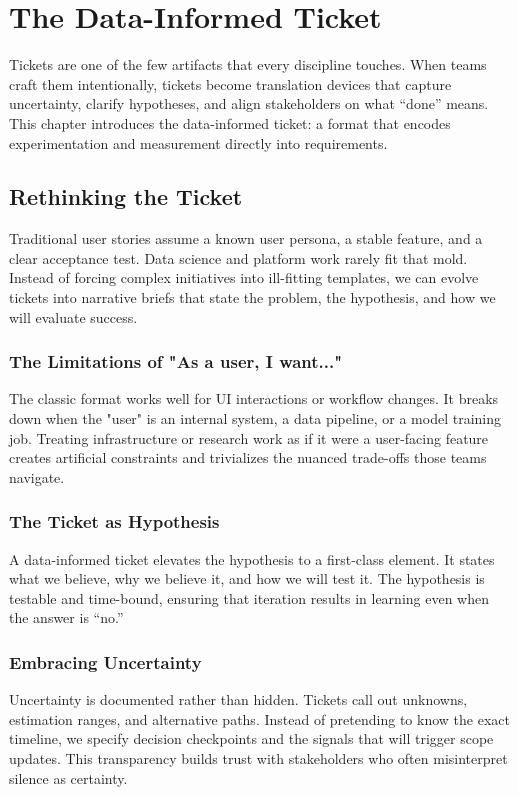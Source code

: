 \chapter{The Data-Informed Ticket}
\label{ch:data-informed-tickets}

Tickets are one of the few artifacts that every discipline touches. When teams craft them intentionally, tickets become translation devices that capture uncertainty, clarify hypotheses, and align stakeholders on what ``done'' means. This chapter introduces the data-informed ticket: a format that encodes experimentation and measurement directly into requirements.

\section{Rethinking the Ticket}
\label{sec:rethinking-ticket}

Traditional user stories assume a known user persona, a stable feature, and a clear acceptance test. Data science and platform work rarely fit that mold. Instead of forcing complex initiatives into ill-fitting templates, we can evolve tickets into narrative briefs that state the problem, the hypothesis, and how we will evaluate success.

\subsection{The Limitations of "As a user, I want..."}
The classic format works well for UI interactions or workflow changes. It breaks down when the "user" is an internal system, a data pipeline, or a model training job. Treating infrastructure or research work as if it were a user-facing feature creates artificial constraints and trivializes the nuanced trade-offs those teams navigate.

\subsection{The Ticket as Hypothesis}
A data-informed ticket elevates the hypothesis to a first-class element. It states what we believe, why we believe it, and how we will test it. The hypothesis is testable and time-bound, ensuring that iteration results in learning even when the answer is ``no.''

\subsection{Embracing Uncertainty}
Uncertainty is documented rather than hidden. Tickets call out unknowns, estimation ranges, and alternative paths. Instead of pretending to know the exact timeline, we specify decision checkpoints and the signals that will trigger scope updates. This transparency builds trust with stakeholders who often misinterpret silence as certainty.

